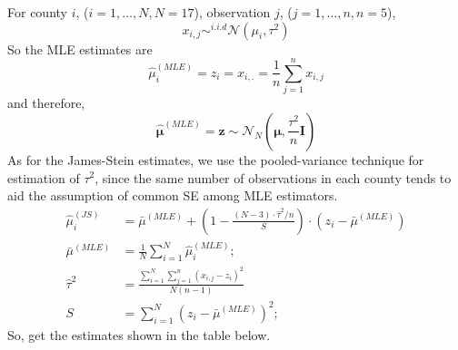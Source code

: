 \documentclass{article}
\begin{document}
For county $i$, ($i=1,\dots,N, N=17$), observation $j$, ($j=1,\dots,n, n=5$),
\begin{displaymath}
x_{i,j} \sim^{i.i.d} \mathcal{N}(\mu_i,\tau^2)
\end{displaymath}
So the MLE estimates are
\begin{displaymath}
\hat{\mu}_i^{(MLE)}= z_i = x_{i,.} = \frac{1}{n} \sum_{j=1}^n x_{i,j}
\end{displaymath}
and therefore,
\begin{displaymath}
\hat{\bm{\mu}}^{(MLE)}=\bm{z} \sim \mathcal{N}_N(\bm{\mu},\frac{\tau^2}{n}\bm{I})
\end{displaymath}
As for the James-Stein estimates, we use the pooled-variance technique for estimation
of $\tau^2$, since the same number of observations in each county tends to aid the 
assumption of common SE among MLE estimators.
\begin{displaymath}
\begin{split}
\hat{\mu}_i^{(JS)} &= \bar{\mu}^{(MLE)} + 
(1-\frac{(N-3)\cdot \hat{\tau}^2/n}{S})\cdot(z_i - \bar{\mu}^{(MLE)}) \\
\bar{\mu}^{(MLE)} &= \frac{1}{N} \sum_{i=1}^N \hat{\mu}_i^{(MLE)}; \\
\hat{\tau}^2 &= \frac{\sum_{i=1}^N \sum_{j=1}^n (x_{i,j} - z_i)^2}{N(n-1)} \\
S &= \sum_{i=1}^N (z_i - \bar{\mu}^{(MLE)})^2;
\end{split}
\end{displaymath}
So, get the estimates shown in the table below.
\end{document}
